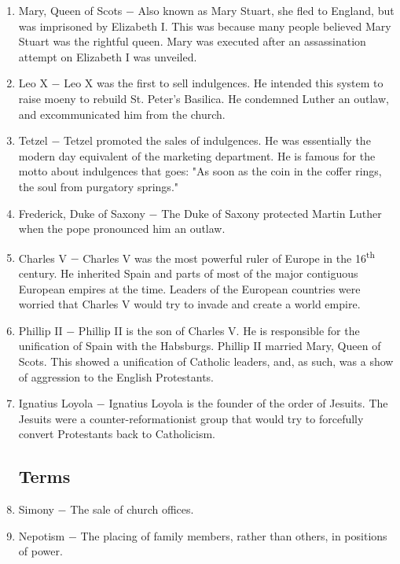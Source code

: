 \documentclass[12pt]{article}
\begin{document}
\begin{enumerate}
\item Mary, Queen of Scots $-$ Also known as Mary Stuart, she fled to England, but was imprisoned by Elizabeth I. This was because many people believed Mary Stuart was the rightful queen. Mary was executed after an assassination attempt on Elizabeth I was unveiled.

\item Leo X $-$ Leo X was the first to sell indulgences. He intended this system to raise moeny to rebuild St. Peter's Basilica. He condemned Luther an outlaw, and excommunicated him from the church.

\item Tetzel $-$ Tetzel promoted the sales of indulgences. He was essentially the modern day equivalent of the marketing department. He is famous for the motto about indulgences that goes: "As soon as the coin in the coffer rings, the soul from purgatory springs."

\item Frederick, Duke of Saxony $-$ The Duke of Saxony protected Martin Luther when the pope pronounced him an outlaw.

\item Charles V $-$ Charles V was the most powerful ruler of Europe in the 16\textsuperscript{th} century. He inherited Spain and parts of most of the major contiguous European empires at the time. Leaders of the European countries were worried that Charles V would try to invade and create a world empire.

\item Phillip II $-$ Phillip II is the son of Charles V. He is responsible for the unification of Spain with the Habsburgs. Phillip II married Mary, Queen of Scots. This showed a unification of Catholic leaders, and, as such, was a show of aggression to the English Protestants.

\item Ignatius Loyola $-$ Ignatius Loyola is the founder of the order of Jesuits. The Jesuits were a counter-reformationist group that would try to forcefully convert Protestants back to Catholicism.

\subsection{Terms}

\item Simony $-$ The sale of church offices.

\item Nepotism $-$ The placing of family members, rather than others, in positions of power.


\end{enumerate}
\end{document}
